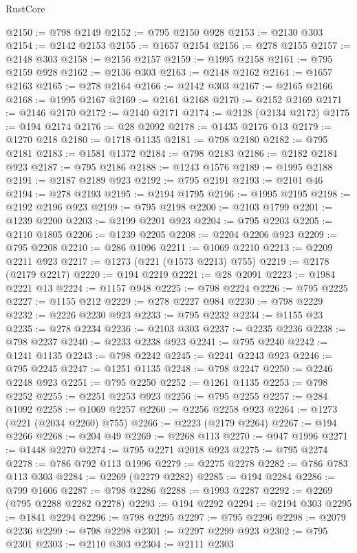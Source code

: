 \begin{lexlean}{RustCore}
\begin{coremodule}
@2150 := @798 @2149
@2152 := @795 @2150 @928
@2153 := @2130 @303
@2154 := @2142 @2153
@2155 := @1657 @2154
@2156 := @278 @2155
@2157 := @2148 @303
@2158 := @2156 @2157
@2159 := @1995 @2158
@2161 := @795 @2159 @928
@2162 := @2136 @303
@2163 := @2148 @2162
@2164 := @1657 @2163
@2165 := @278 @2164
@2166 := @2142 @303
@2167 := @2165 @2166
@2168 := @1995 @2167
@2169 := @2161 @2168
@2170 := @2152 @2169
@2171 := @2146 @2170
@2172 := @2140 @2171
@2174 := @2128 (@2134 @2172)
@2175 := @194 @2174
@2176 := @28 @2092
@2178 := @1435 @2176 @13
@2179 := @1270 @218
@2180 := @1718 @1135
@2181 := @798 @2180
@2182 := @795 @2181
@2183 := @1581 @1372
@2184 := @798 @2183
@2186 := @2182 @2184 @923
@2187 := @795 @2186
@2188 := @1243 @1576
@2189 := @1995 @2188
@2191 := @2187 @2189 @923
@2192 := @795 @2191
@2193 := @2101 @46
@2194 := @278 @2193
@2195 := @2194 @1795
@2196 := @1995 @2195
@2198 := @2192 @2196 @923
@2199 := @795 @2198
@2200 := @2103 @1799
@2201 := @1239 @2200
@2203 := @2199 @2201 @923
@2204 := @795 @2203
@2205 := @2110 @1805
@2206 := @1239 @2205
@2208 := @2204 @2206 @923
@2209 := @795 @2208
@2210 := @286 @1096
@2211 := @1069 @2210
@2213 := @2209 @2211 @923
@2217 := @1273 (@221 (@1573 @2213) @755)
@2219 := @2178 (@2179 @2217)
@2220 := @194 @2219
@2221 := @28 @2091
@2223 := @1984 @2221 @13
@2224 := @1157 @948
@2225 := @798 @2224
@2226 := @795 @2225
@2227 := @1155 @212
@2229 := @278 @2227 @984
@2230 := @798 @2229
@2232 := @2226 @2230 @923
@2233 := @795 @2232
@2234 := @1155 @23
@2235 := @278 @2234
@2236 := @2103 @303
@2237 := @2235 @2236
@2238 := @798 @2237
@2240 := @2233 @2238 @923
@2241 := @795 @2240
@2242 := @1241 @1135
@2243 := @798 @2242
@2245 := @2241 @2243 @923
@2246 := @795 @2245
@2247 := @1251 @1135
@2248 := @798 @2247
@2250 := @2246 @2248 @923
@2251 := @795 @2250
@2252 := @1261 @1135
@2253 := @798 @2252
@2255 := @2251 @2253 @923
@2256 := @795 @2255
@2257 := @284 @1092
@2258 := @1069 @2257
@2260 := @2256 @2258 @923
@2264 := @1273 (@221 (@2034 @2260) @755)
@2266 := @2223 (@2179 @2264)
@2267 := @194 @2266
@2268 := @204 @49
@2269 := @2268 @113
@2270 := @947 @1996
@2271 := @1448 @2270
@2274 := @795 @2271 @2018 @923
@2275 := @795 @2274
@2278 := @786 @792 @113 @1996
@2279 := @2275 @2278
@2282 := @786 @783 @113 @303
@2284 := @2269 (@2279 @2282)
@2285 := @194 @2284
@2286 := @799 @1606
@2287 := @798 @2286
@2288 := @1993 @2287
@2292 := @2269 (@795 @2288 @2282 @2278)
@2293 := @194 @2292
@2294 := @2194 @303
@2295 := @1841 @2294
@2296 := @798 @2295
@2297 := @795 @2296
@2298 := @2079 @2236
@2299 := @798 @2298
@2301 := @2297 @2299 @923
@2302 := @795 @2301
@2303 := @2110 @303
@2304 := @2111 @2303

\end{coremodule}
\end{lexlean}
